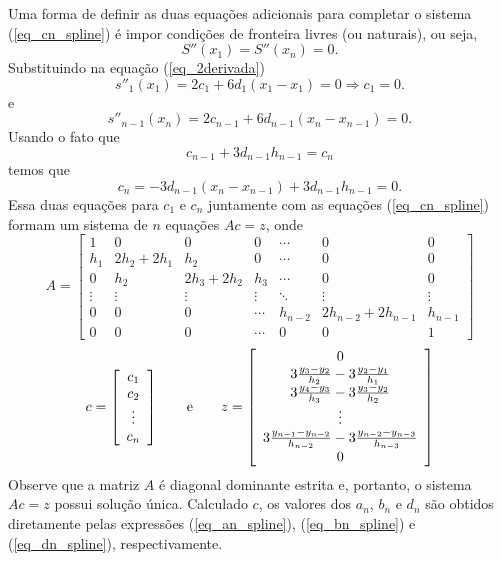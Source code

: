 \documentclass[main.tex]{subfiles}
\begin{document}
Uma forma de definir as duas equações adicionais para completar o sistema (\ref{eq_cn_spline}) é impor condições de fronteira livres (ou naturais), ou seja,
\begin{equation}
S''(x_1)=S''(x_n)=0.
\end{equation}
Substituindo na equação (\ref{eq_2derivada})
$$
s''_1(x_1)=2c_1+6d_1(x_1-x_1)=0 \Longrightarrow c_1=0.
$$
e
$$
s''_{n-1}(x_n)=2c_{n-1}+6d_{n-1}(x_{n}-x_{n-1})=0 .
$$
Usando o fato que
$$
c_{n-1}+3d_{n-1}h_{n-1}=c_{n}
$$
temos que
$$
c_n=-3d_{n-1}(x_{n}-x_{n-1})+3d_{n-1}h_{n-1}=0.
$$
Essa duas equações para $c_1$ e $c_n$ juntamente com as equações (\ref{eq_cn_spline}) formam um sistema de $n$ equações $Ac=z$, onde
\begin{equation}
A=\left[\begin{array}{ccccccc}
1 &0&0&0 &\cdots&0&0\\
h_1&2h_2+2h_{1}&h_2&0&\cdots&0&0\\
0&h_2&2h_3+2h_{2}&h_3&\cdots&0&0\\
\vdots&\vdots&\vdots&\vdots&\ddots&\vdots&\vdots\\
0&0&0&\cdots&h_{n-2} & 2h_{n-2}+2h_{n-1}&h_{n-1}\\
0&0&0&\cdots &0&0&1
\end{array}\right]  
\end{equation}
\begin{equation}
c = \left[\begin{array}{c}
c_1\\
c_2\\
\vdots\\
c_n
\end{array}\right]\qquad \hbox{e}\qquad
z = \left[\begin{array}{c}
0\\
3\frac{y_{3}-y_2}{h_2}-3\frac{y_{2}-y_{1}}{h_{1}}\\
3\frac{y_{4}-y_3}{h_3}-3\frac{y_{3}-y_{2}}{h_{2}}\\
\vdots\\
3\frac{y_{n-1}-y_{n-2}}{h_{n-2}}-3\frac{y_{n-2}-y_{n-3}}{h_{n-3}}\\
0
\end{array}\right]
\end{equation}
Observe que a matriz $A$ é diagonal dominante estrita e, portanto, o sistema $Ac=z$ possui solução única. Calculado $c$, os valores dos $a_n$, $b_n$ e $d_n$ são obtidos diretamente pelas expressões (\ref{eq_an_spline}), (\ref{eq_bn_spline}) e (\ref{eq_dn_spline}), respectivamente.
\end{document}
